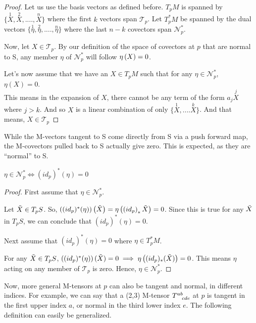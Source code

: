 \begin{proof}
    Let us use the basis vectors as defined before. 
    $T_pM$ is spanned by $\{ \overset{1}{X}, \overset{2}{X},....,\overset{n}{X}\}$ where the first $ k$ vectors span $\mathscr{T}_p$. Let $T^*_pM$ be spanned by the dual vectors $\{\overset{1}{\eta}, \overset{2}{\eta},....,\overset{n}{\eta}\}$ where the last $n-k$ covectors span $\mathscr{N}^*_p$.

    Now, let $X \in \mathscr{T}_p$. By our definition of the space of covectors at $ p$ that are normal to S, any member $ \eta$ of $ \mathscr{N}^*_p$ will follow $ \eta \left( X \right)=0$.


    Let's now assume that we have an $X \in T_pM$ such that for any $\eta \in \mathscr{N}^*_p$, $\eta(X)=0$.\\
    This means in the expansion of $ X$, there cannot be any term of the form $a_j \overset{j}{X}$ where $j>k$. And so $ X$ is a linear combination of only $\{\overset{1}{X},.... \overset{k}{X}\}$. And that means, $X \in \mathscr{T}_p$
    
    
\end{proof}

While the M-vectors tangent to S come directly from S via a push forward map, the M-covectors pulled back to S actually give zero. This is expected, as they are ``normal'' to S.

\begin{proposition}
     $\eta \in \mathscr{N}^*_p \iff (id_p)^*(\eta)=0$
\end{proposition}
\begin{proof}
    First assume that $\eta \in \mathscr{N}^*_p$.
    
    Let $\Tilde{X} \in T_pS $. So, $\left( (id_p)^*(\eta) \right)\left( \Tilde{X} \right) = \eta \left( \left( id_p \right)_*\Tilde{X} \right)=0$. Since this is true for any $\Tilde{X}$ in $T_pS$, we can conclude that $(id_p)^*(\eta)=0$.

    Next assume that $(id_p)^*(\eta)=0$ where $\eta \in T_p^*M $.
    
    For any $\Tilde{X} \in T_pS$, $\left( (id_p)^*(\eta) \right)(\Tilde{X}) =0 \implies \eta \left( (id_p)_*(\Tilde{X}) \right) =0$. This means $\eta$ acting on any member of $\mathscr{T}_p$ is zero. Hence, $\eta \in \mathscr{N}^*_p$.
    
\end{proof}


Now, more general M-tensors at $p$ can also be tangent and normal, in different indices. For example, we can say that a (2,3) M-tensor $ \tt{T}{ab}{cde}$ at $p$ is tangent in the first upper index $a$, or normal in the third lower index $e$. The following definition can easily be generalized.

